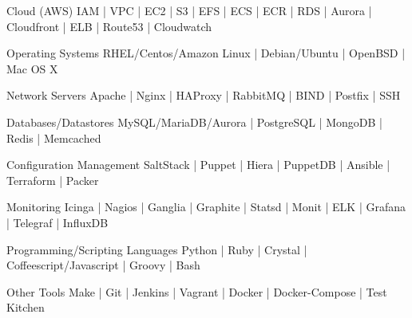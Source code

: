 

\begin{cvskills}

  \cvskill
    {Cloud (AWS)} %
    { IAM | VPC | EC2 | S3 | EFS | ECS | ECR | RDS | Aurora | Cloudfront | ELB | Route53 | Cloudwatch} %

  \cvskill
    {Operating Systems}
    {RHEL/Centos/Amazon Linux | Debian/Ubuntu | OpenBSD | Mac OS X}

  \cvskill
    {Network Servers}
    {Apache | Nginx | HAProxy | RabbitMQ | BIND | Postfix | SSH}

  \cvskill
    {Databases/Datastores}
    {MySQL/MariaDB/Aurora | PostgreSQL | MongoDB | Redis | Memcached}

  \cvskill
    {Configuration Management}
    {SaltStack | Puppet | Hiera | PuppetDB | Ansible | Terraform | Packer}

  \cvskill
    {Monitoring}
    {Icinga | Nagios | Ganglia | Graphite | Statsd | Monit | ELK | Grafana | Telegraf | InfluxDB}

  \cvskill
    {Programming/Scripting Languages}
    {Python | Ruby | Crystal | Coffeescript/Javascript | Groovy | Bash}

  \cvskill
    {Other Tools}
    {Make | Git | Jenkins | Vagrant | Docker | Docker-Compose | Test Kitchen}

\end{cvskills}

